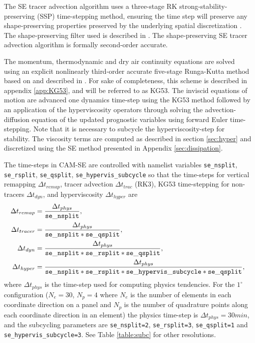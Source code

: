 \documentclass{agujournal}
\begin{document}
The SE tracer advection algorithm uses a three-stage RK strong-stability-preserving (SSP) time-stepping method, ensuring the time step will preserve any shape-preserving properties preserved by the underlying spatial discretization \citep{SR2002SIAM}. The shape-preserving filter used is described in \citet{GTS2014JCP}. The shape-preserving SE tracer advection algorithm is formally second-order accurate.

The momentum, thermodynamic and dry air continuity equations are solved using an explicit nonlinearly third-order accurate five-stage Runga-Kutta method based on \cite{KG1984MCSb} and described in \cite[][ see their equation (56)]{GU2016GMD}. For sake of completeness, this scheme is described in appendix \ref{app:KG53}, and will be referred to as KG53.  The inviscid equations of motion are advanced one dynamics time-step using the KG53 method followed by an application of the hyperviscosity operators through solving the advection-diffusion equation of the updated prognostic variables using forward Euler time-stepping. Note that it is necessary to subcycle the hyperviscosity-step for stability. The viscosity terms are computed as described in section \ref{sec:hyper} and discretized using the SE method presented in Appendix \ref{sec:dissipation}.


The time-steps in CAM-SE are controlled with namelist variables {\tt{se\_nsplit}}, {\tt{se\_rsplit}}, {\tt{se\_qsplit}},
{\tt{se\_hypervis\_subcycle}}  so that the time-steps for vertical remapping $\Delta t_{remap}$, tracer advection $\Delta t_{trac}$ (RK3), KG53 time-stepping for non-tracers $\Delta t_{dyn}$, and hyperviscosity $\Delta t_{hyper}$ are
\begin{align}
\Delta t_{remap}&=\frac{\Delta t_{phys}}{\tt{se\_nsplit}},\\
\Delta t_{tracer}&=\frac{\Delta t_{phys}}{\tt{se\_nsplit}*\tt{se\_qsplit}},\\
\Delta t_{dyn}&=\frac{\Delta t_{phys}}{\tt{se\_nsplit*se\_rsplit}*\tt{se\_qsplit}},\\
\Delta t_{hyper}&=\frac{\Delta t_{phys}}{\tt{se\_nsplit*se\_rsplit*se\_hypervis\_subcycle}*\tt{se\_qsplit}},
\end{align}
where $\Delta t_{phys}$ is the time-step used for computing physics tendencies. For the $1^\circ$ configuration ($N_e=30$, $N_p=4$ where $N_e$ is the number of elements in each coordinate direction on a panel and $N_p$ is the number of quadrature points along each coordinate direction in an element) the physics time-step is $\Delta t_{phys}=30 min$, and the subcycling parameters are {\tt{se\_nsplit}=2}, {\tt{se\_rsplit=3}}, {\tt{se\_qsplit=1}} and {\tt{se\_hypervis\_subcycle=3}}. See Table \ref{table:subc} for other resolutions.
\end{document}
